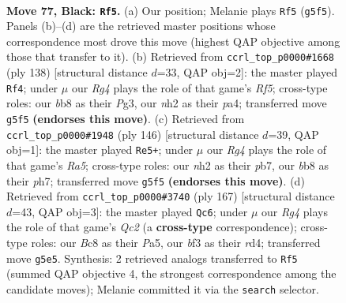 \documentclass[11pt]{article}
\begin{document}
\clearpage

\begin{figure}[p]\centering
\begin{subfigure}{0.46\textwidth}\centering
\resizebox{\linewidth}{!}{%
\newchessgame
\chessboard[
  setfen={1Bb2k2/8/8/6r1/PP6/2K2B1p/1R5N/8 b - - 12 77},
  showmover=false,
  pgfstyle=straightmove, color=movearrow, markmove={g5-f5}
]}
\caption{}
\end{subfigure}\hfill
\begin{subfigure}{0.46\textwidth}\centering
\resizebox{\linewidth}{!}{%
\newchessgame
\chessboard[
  setfen={r7/6bk/7p/5R1P/p7/B5P1/8/6K1 w - - 7 70},
  showmover=false,
  pgfstyle=straightmove, color=movearrow, markmove={f5-f4}
]}
\caption{}
\end{subfigure}
\\[4pt]
\begin{subfigure}{0.46\textwidth}\centering
\resizebox{\linewidth}{!}{%
\newchessgame
\chessboard[
  setfen={8/1p2r2p/2b1k2P/R7/5P2/2B5/5K2/8 w - - 19 74},
  showmover=false,
  pgfstyle=straightmove, color=movearrow, markmove={a5-e5}
]}
\caption{}
\end{subfigure}\hfill
\begin{subfigure}{0.46\textwidth}\centering
\resizebox{\linewidth}{!}{%
\newchessgame
\chessboard[
  setfen={8/2q5/8/p6p/P2R4/4BN2/k3K3/8 b - - 15 84},
  showmover=false,
  pgfstyle=straightmove, color=movearrow, markmove={c7-c6}
]}
\caption{}
\end{subfigure}
\caption{\textbf{Move 77, Black: \texttt{Rf5}.} (a) Our position; Melanie plays \texttt{Rf5} (\texttt{g5f5}). Panels (b)--(d) are the retrieved master positions whose correspondence most drove this move (highest QAP objective among those that transfer to it). (b) Retrieved from \texttt{ccrl\_top\_p0000\#1668} (ply 138) [structural distance $d$=33, QAP obj=2]: the master played \texttt{Rf4}; under $\mu$ our \emph{Rg4} plays the role of that game's \emph{Rf5}; cross-type roles: our \emph{b}b8 as their \emph{P}g3, our \emph{n}h2 as their \emph{p}a4; transferred move \texttt{g5f5} \textbf{(endorses this move)}. (c) Retrieved from \texttt{ccrl\_top\_p0000\#1948} (ply 146) [structural distance $d$=39, QAP obj=1]: the master played \texttt{Re5+}; under $\mu$ our \emph{Rg4} plays the role of that game's \emph{Ra5}; cross-type roles: our \emph{n}h2 as their \emph{p}b7, our \emph{b}b8 as their \emph{p}h7; transferred move \texttt{g5f5} \textbf{(endorses this move)}. (d) Retrieved from \texttt{ccrl\_top\_p0000\#3740} (ply 167) [structural distance $d$=43, QAP obj=3]: the master played \texttt{Qc6}; under $\mu$ our \emph{Rg4} plays the role of that game's \emph{Qc2} (a \textbf{cross-type} correspondence); cross-type roles: our \emph{B}c8 as their \emph{P}a5, our \emph{b}f3 as their \emph{r}d4; transferred move \texttt{g5e5}. Synthesis: 2 retrieved analogs transferred to \texttt{Rf5} (summed QAP objective 4, the strongest correspondence among the candidate moves); Melanie committed it via the \texttt{search} selector.}
\label{fig:thought-m153}
\end{figure}
\end{document}

